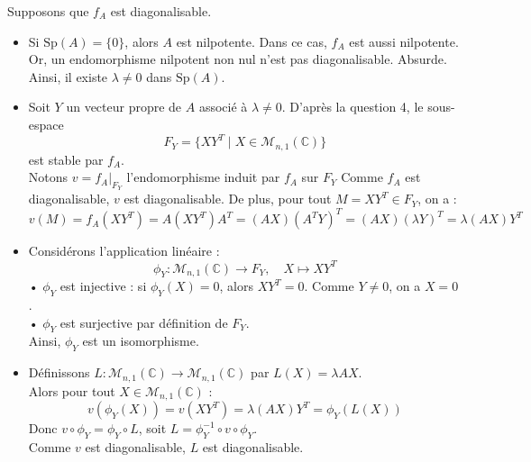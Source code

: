 \documentclass[a4paper,12pt]{article}
\begin{document}
\begin{enumerate}
        \begin{correctionbox}
            Supposons que \(f_A\) est diagonalisable.\\
            \begin{itemize}
                \item Si \(\mathrm{Sp}(A) = \{0\}\), alors \(A\) est nilpotente. Dans ce cas, \(f_A\) est aussi nilpotente. Or, un endomorphisme nilpotent non nul n'est pas diagonalisable. Absurde. \\
                Ainsi, il existe \(\lambda \neq 0\) dans \(\mathrm{Sp}(A)\).\\
                
                \item Soit \(Y\) un vecteur propre de \(A\) associé à \(\lambda \neq 0\).
                D'après la question 4, le sous-espace 
                \[
                F_Y = \{XY^T \mid X \in \mathcal{M}_{n,1}(\mathbb{C})\}
                \] 
                est stable par \(f_A\). \\
                
                Notons \(v = f_A|_{F_Y}\) l'endomorphisme induit par \(f_A\) sur \(F_Y\) Comme \(f_A\) est diagonalisable, \(v\) est diagonalisable. De plus, pour tout \(M = XY^T \in F_Y\), on a :
                \[
                v(M) = f_A(XY^T) = A(XY^T)A^T = (AX)(A^TY)^T = (AX)(\lambda Y)^T = \lambda (AX)Y^T
                \]
                \item Considérons l'application linéaire :
                \[
                \phi_Y : \mathcal{M}_{n,1}(\mathbb{C}) \to F_Y, \quad X \mapsto XY^T
                \] 
                • \(\phi_Y\) est injective : si \(\phi_Y(X) = 0\), alors \(XY^T = 0\). Comme \(Y \neq 0\), on a \(X = 0\). \\
                • \(\phi_Y\) est surjective par définition de \(F_Y\). \\
                Ainsi, \(\phi_Y\) est un isomorphisme. \\
                
                \item Définissons \(L : \mathcal{M}_{n,1}(\mathbb{C}) \to \mathcal{M}_{n,1}(\mathbb{C})\) par \(L(X) = \lambda AX\). \\[2pt]
                Alors pour tout \(X \in \mathcal{M}_{n,1}(\mathbb{C})\) :
                \[
                v(\phi_Y(X)) = v(XY^T) = \lambda (AX)Y^T = \phi_Y(L(X))
                \] 
                Donc \(v \circ \phi_Y = \phi_Y \circ L\), soit \(L = \phi_Y^{-1} \circ v \circ \phi_Y\). \\[2pt]
                Comme \(v\) est diagonalisable, \(L\) est diagonalisable.\\
                

\end{itemize}
\end{correctionbox}
\end{enumerate}
\end{document}
